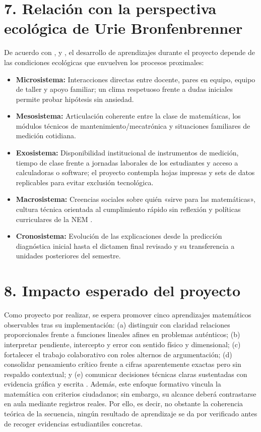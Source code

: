 \documentclass[spanish,letterpaper,oneside]{article}
\begin{document}
\section{7. Relación con la perspectiva ecológica de Urie Bronfenbrenner}
De acuerdo con \citet{bronfenbrenner2006bioecologico}, \citet{bronfenbrenner1987ecologia} y \citet{tong2023bioecological}, el desarrollo de aprendizajes durante el proyecto depende de las condiciones ecológicas que envuelven los procesos proximales:
\begin{itemize}
  \item \textbf{Microsistema:} Interacciones directas entre docente, pares en equipo, equipo de taller y apoyo familiar; un clima respetuoso frente a dudas iniciales permite probar hipótesis sin ansiedad.
  \item \textbf{Mesosistema:} Articulación coherente entre la clase de matemáticas, los módulos técnicos de mantenimiento/mecatrónica y situaciones familiares de medición cotidiana.
  \item \textbf{Exosistema:} Disponibilidad institucional de instrumentos de medición, tiempo de clase frente a jornadas laborales de los estudiantes y acceso a calculadoras o software; el proyecto contempla hojas impresas y sets de datos replicables para evitar exclusión tecnológica.
  \item \textbf{Macrosistema:} Creencias sociales sobre quién «sirve para las matemáticas», cultura técnica orientada al cumplimiento rápido sin reflexión y políticas curriculares de la NEM \citep{unesco2015replantear}.
  \item \textbf{Cronosistema:} Evolución de las explicaciones desde la predicción diagnóstica inicial hasta el dictamen final revisado y su transferencia a unidades posteriores del semestre.
\end{itemize}

\section{8. Impacto esperado del proyecto}
Como proyecto por realizar, se espera promover cinco aprendizajes matemáticos observables tras su implementación: (a) distinguir con claridad relaciones proporcionales frente a funciones lineales afines en problemas auténticos; (b) interpretar pendiente, intercepto y error con sentido físico y dimensional; (c) fortalecer el trabajo colaborativo con roles alternos de argumentación; (d) consolidar pensamiento crítico frente a cifras aparentemente exactas pero sin respaldo contextual; y (e) comunicar decisiones técnicas claras sustentadas con evidencia gráfica y escrita \citep{bostrom2023formative}. Además, este enfoque formativo vincula la matemática con criterios ciudadanos; sin embargo, su alcance deberá contrastarse en aula mediante registros reales. Por ello, es decir, no obstante la coherencia teórica de la secuencia, ningún resultado de aprendizaje se da por verificado antes de recoger evidencias estudiantiles concretas.
\end{document}
